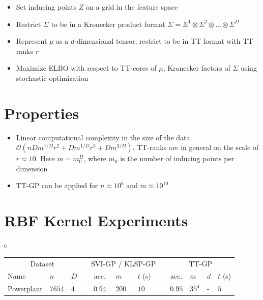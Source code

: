 \documentclass[a0,portrait]{a0poster}
\newcommand{\bigO}{\mathcal{O}}
\begin{document}
\begin{multicols}{2}
\begin{itemize}
  \item Set inducing points $Z$ on a grid in the feature space
  \item Restrict $\Sigma$ to be in a Kronecker product format
    $
      \Sigma = \Sigma^1 \otimes \Sigma^2\otimes \ldots \otimes \Sigma^D
    $
  \item Represent $\mu$ as a $d$-dimensional tensor, restrict to be in TT format
    with TT-ranks $r$
  \item Maximize ELBO with respect to TT-cores of $\mu$, Kronecker factors of 
    $\Sigma$ using stochastic optimization
\end{itemize}

\section*{\LARGE \color{NavyBlue} Properties}
    
\begin{itemize}
  \item Linear computational complexity in the size of the data
    $\bigO(n D m^{1 / D} r^2 + D m^{1 / D} r^3 + D m^{3 / D})$. 
    TT-ranks are in general on the scale of $r \approx 10$.
    Here $m = m_0^D$, where $m_0$ is the number of inducing points per
    dimension
  \item TT-GP can be applied for $n \approx 10^6$ and $m \approx 10^{10}$
\end{itemize}

\section*{\LARGE \color{NavyBlue} RBF Kernel Experiments}

\begin{tabular}{c}
  \begin{tabular}{lll l cll l clll}
    \toprule
    \multicolumn{3}{c}{Dataset} && \multicolumn{3}{c}{SVI-GP / KLSP-GP} && \multicolumn{4}{c}{TT-GP} \\
    \cmidrule{1-3}
    \cmidrule{5-7}
    \cmidrule{9-12}

    Name & $n$ & $D$ &&
    acc. & $m$ & $t$ (s) &&
    acc. & $m$ & $d$ & $t$ (s)\\
    \midrule

    Powerplant & $7654$ & $4$ &&
    $0.94$ & $200$ & $10$ &&
    $\mathbf{0.95}$ & $35^4$ & - & $5$ \\


\end{tabular}
\end{tabular}
\end{multicols}
\end{document}
